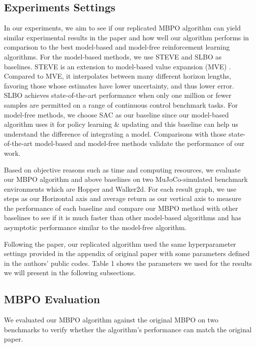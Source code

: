 \documentclass{article}
\begin{document}
\subsection{Experiments Settings}

In our experiments, we aim to see if our replicated MBPO algorithm can yield similar experimental results in the paper and how well our algorithm performs in comparison to the best model-based and model-free reinforcement learning algorithms. For the model-based methods, we use STEVE and SLBO as baselines. STEVE is an extension to model-based value expansion (MVE) \cite{ref11}. Compared to MVE, it interpolates between many different horizon lengths, favoring those whose estimates have lower uncertainty, and thus lower error. SLBO achieves state-of-the-art performance when only one million or fewer samples are permitted on a range of continuous control benchmark tasks. For model-free methods, we choose SAC as our baseline since our model-based algorithm uses it for policy learning \& updating and this baseline can help us understand the difference of integrating a model. Comparisons with those state-of-the-art model-based and model-free methods validate the performance of our work.

Based on objective reasons such as time and computing resources, we evaluate our MBPO algorithm and above baselines on two MuJoCo-simulated benchmark environments which are Hopper and Walker2d. For each result graph, we use steps as our Horizontal axis and average return as our vertical axis to measure the performance of each baseline and compare our MBPO method with other baselines to see if it is much faster than other model-based algorithms and has asymptotic performance similar to the model-free algorithm.

Following the paper, our replicated algorithm used the same hyperparameter settings provided in the appendix of original paper with some parameters defined in the authors' public codes. Table 1 shows the parameters we used for the results we will present in the following subsections.

\subsection{MBPO Evaluation}
We evaluated our MBPO algorithm against the original MBPO on two benchmarks to verify whether the algorithm's performance can match the original paper.  
\end{document}
